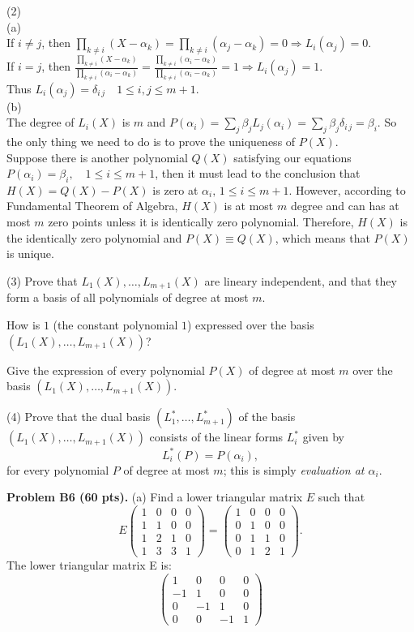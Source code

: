 \documentclass[12pt]{article}
\begin{document}
\medskip
(2) \\
(a) \\
If $i \neq j$, then $\prod_{k \neq i}(X - \alpha_k) = \prod_{k \neq i}(\alpha_j - \alpha_k) = 0 \Rightarrow L_i(\alpha_j) = 0$. \\
If $i = j$, then $\frac{\prod_{k \neq i}(X - \alpha_k)}{\prod_{k \neq i}(\alpha_i - \alpha_k)} = \frac{\prod_{k \neq i}(\alpha_i - \alpha_k)}{\prod_{k \neq i}(\alpha_i - \alpha_k)} = 1 \Rightarrow L_i(\alpha_j) = 1$.\\
Thus $L_i(\alpha_j) = \delta_{i\, j} \quad 1\leq i, j \leq m + 1$. \\
(b) \\
The degree of $L_i(X)$ is $m$ and $P(\alpha_i) = \sum_j \beta_j L_j(\alpha_i) = \sum_j \beta_j \delta_{i \, j} = \beta_i$. So the only thing we need to do is to prove the uniqueness of $P(X)$. \\
Suppose there is another polynomial $Q(X)$ satisfying our equations $P(\alpha_i) = \beta_i, \quad 1\leq i \leq m + 1$, then it must lead to the conclusion that $H(X) = Q(X) - P(X)$ is zero at $\alpha_i, \, 1 \leq i \leq m+1$. However, according to Fundamental Theorem of Algebra, $H(X)$ is at most $m$ degree and can has at most $m$ zero points unless it is identically zero polynomial. Therefore, $H(X)$ is the identically zero polynomial and $P(X) \equiv Q(X)$, which means that $P(X)$ is unique.

\medskip
(3)
Prove that $L_1(X), \dots, L_{m + 1}(X)$ are lineary independent, and that
they form a basis of all polynomials of degree at most $m$.

\medskip
How is $1$ (the constant polynomial $1$)
expressed over the basis $(L_1(X), \dots, L_{m + 1}(X))$?

\medskip
Give the expression of every polynomial $P(X)$ of degree at most $m$ over
the basis $(L_1(X), \dots, L_{m + 1}(X))$.

\medskip
(4)
Prove that the dual basis $(L_1^*, \dots, L_{m + 1}^*)$
of the basis $(L_1(X), \dots, L_{m + 1}(X))$ consists of the linear forms
$L_i^*$ given by
\[
L_i^*(P) = P(\alpha_i),
\]
for every polynomial $P$ of degree at most $m$;
this is simply {\it evaluation at $\alpha_i$\/}.

\vspace {0.25cm}\noindent
{\bf Problem B6 (60 pts).}
(a)
Find a lower triangular matrix $E$ such that
\[
E 
\begin{pmatrix}
1 & 0 & 0 & 0 \\
1 & 1 & 0 & 0 \\
1 & 2 & 1 & 0 \\
1 & 3 & 3 & 1
\end{pmatrix}
=
\begin{pmatrix}
1 & 0 & 0 & 0 \\
0 & 1 & 0 & 0 \\
0 & 1 & 1 & 0 \\
0 & 1 & 2 & 1 
\end{pmatrix}.
\]
The lower triangular matrix E is:
\[ \begin{pmatrix}
1 & 0 & 0 & 0\\-1 & 1 & 0 & 0\\0 & -1 & 1 & 0\\0 & 0 & -1 & 1
\end{pmatrix}\]
\end{document}
